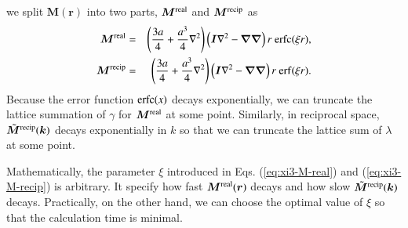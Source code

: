 \documentclass{book}
\begin{document}
we split $\bm{M}(\bm{r})$ into two parts,
$\bm{M}^{\rm real}$ and $\bm{M}^{\rm recip}$ as
\begin{eqnarray}
  \bm{M}^{\rm real}
  &=&
  \left(
    \frac{3a}{4}
    +
    \frac{a^3}{4}
    \nabla^2
  \right)
  \left(
    \bm{I}
    \nabla^2
    -
    \bm{\nabla\nabla}
  \right)
  r\ 
  {\rm erfc} (\xi r),
  \label{eq:xi3-M-real}
  \\
  \bm{M}^{\rm recip}
  &=&
  \left(
    \frac{3a}{4}
    +
    \frac{a^3}{4}
    \nabla^2
  \right)
  \left(
    \bm{I}
    \nabla^2
    -
    \bm{\nabla\nabla}
  \right)
  r\ 
  {\rm erf} (\xi r)
  .
  \label{eq:xi3-M-recip}
\end{eqnarray}
Because the error function ${\rm erfc}(x)$ decays exponentially,
we can truncate the lattice summation of $\gamma$ for $\bm{M}^{\rm real}$
at some point.
Similarly, in reciprocal space, $\tilde{\bm{M}}^{\rm recip}(\bm{k})$
decays exponentially in $k$ so that we can truncate the lattice sum
of $\lambda$ at some point.

Mathematically, the parameter $\xi$ introduced in
Eqs. (\ref{eq:xi3-M-real}) and (\ref{eq:xi3-M-recip})
is arbitrary. It specify how fast $\bm{M}^{\rm real}(\bm{r})$ decays
and how slow $\tilde{\bm{M}}^{\rm recip}(\bm{k})$ decays.
Practically, on the other hand, we can choose the optimal value of $\xi$
so that the calculation time is minimal.
\end{document}
